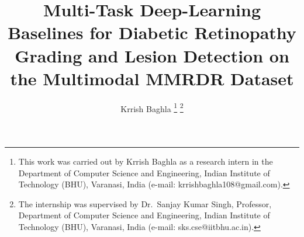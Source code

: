 \documentclass[journal,twoside,web]{ieeecolor}
\begin{document}
\title{Multi-Task Deep-Learning Baselines for Diabetic Retinopathy Grading and Lesion Detection on the Multimodal MMRDR Dataset}

\author{Krrish Baghla
\thanks{This work was carried out by Krrish Baghla as a research intern in the
Department of Computer Science and Engineering, Indian Institute of Technology
(BHU), Varanasi, India (e-mail: krrishbaghla108@gmail.com).}
\thanks{The internship was supervised by Dr.~Sanjay Kumar Singh, Professor,
Department of Computer Science and Engineering, Indian Institute of Technology
(BHU), Varanasi, India (e-mail: sks.cse@iitbhu.ac.in).}}

\maketitle
\end{document}
